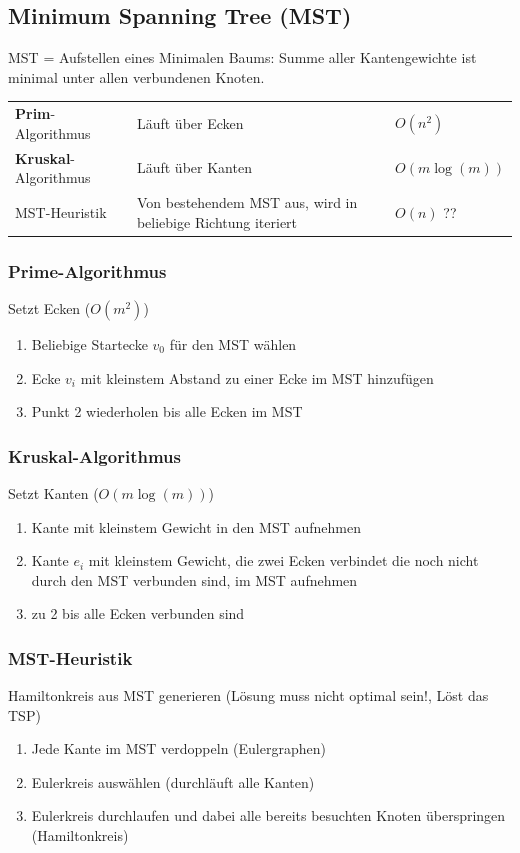 	

	
	
  	


\subsection{Minimum Spanning Tree (MST)}

MST = Aufstellen eines Minimalen Baums: Summe aller Kantengewichte ist minimal unter allen verbundenen Knoten.
	
	\begin{tabularx}{\textwidth}{p{4cm} X p{4cm}}
	  \textbf{Prim}-Algorithmus
	    & Läuft über Ecken
	    & $O(n^2)$ \\
	  \textbf{Kruskal}-Algorithmus
	    & Läuft über Kanten
	    & $O(m \log(m))$\\
	  MST-Heuristik
	    & Von bestehendem MST aus, wird in beliebige Richtung iteriert
	    & $O(n)$ ??
	\end{tabularx}


\subsubsection{Prime-Algorithmus}
Setzt Ecken ($O(m^2)$)
\begin{enumerate}
	\item Beliebige Startecke $v_0$ für den MST wählen
	\item Ecke $v_i$ mit kleinstem Abstand zu einer Ecke im MST hinzufügen
	\item Punkt 2 wiederholen bis alle Ecken im MST
\end{enumerate}


\subsubsection{Kruskal-Algorithmus}
Setzt Kanten ($O(m \log(m))$)
\begin{enumerate}
	\item Kante mit kleinstem Gewicht in den MST aufnehmen
	\item Kante $e_i$ mit kleinstem Gewicht, die zwei Ecken verbindet die noch nicht durch den MST verbunden sind, im MST aufnehmen
	\item zu 2 bis alle Ecken verbunden sind
\end{enumerate}


\subsubsection{MST-Heuristik}
Hamiltonkreis aus MST generieren (Lösung muss nicht optimal sein!, Löst das TSP)
\begin{enumerate}
	\item Jede Kante im MST verdoppeln (Eulergraphen)
	\item Eulerkreis auswählen (durchläuft alle Kanten)
	\item Eulerkreis durchlaufen und dabei alle bereits besuchten Knoten überspringen (Hamiltonkreis)
\end{enumerate}


